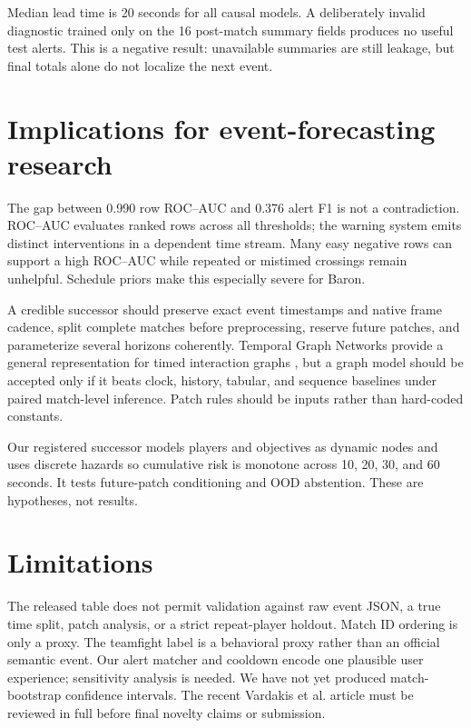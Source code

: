 \documentclass[10pt]{article}
\begin{document}
Median lead time is 20 seconds for all causal models. A deliberately invalid
diagnostic trained only on the 16 post-match summary fields produces no useful
test alerts. This is a negative result: unavailable summaries are still
leakage, but final totals alone do not localize the next event.

\section{Implications for event-forecasting research}

The gap between 0.990 row ROC--AUC and 0.376 alert F1 is not a contradiction.
ROC--AUC evaluates ranked rows across all thresholds; the warning system emits
distinct interventions in a dependent time stream. Many easy negative rows can
support a high ROC--AUC while repeated or mistimed crossings remain unhelpful.
Schedule priors make this especially severe for Baron.

A credible successor should preserve exact event timestamps and native frame
cadence, split complete matches before preprocessing, reserve future patches,
and parameterize several horizons coherently. Temporal Graph Networks provide a
general representation for timed interaction graphs \cite{rossi2020tgn}, but a
graph model should be accepted only if it beats clock, history, tabular, and
sequence baselines under paired match-level inference. Patch rules should be
inputs rather than hard-coded constants.

Our registered successor models players and objectives as dynamic nodes and
uses discrete hazards so cumulative risk is monotone across 10, 20, 30, and 60
seconds. It tests future-patch conditioning and OOD abstention. These are
hypotheses, not results.

\section{Limitations}

The released table does not permit validation against raw event JSON, a true
time split, patch analysis, or a strict repeat-player holdout. Match ID ordering
is only a proxy. The teamfight label is a behavioral proxy rather than an
official semantic event. Our alert matcher and cooldown encode one plausible
user experience; sensitivity analysis is needed. We have not yet produced
match-bootstrap confidence intervals. The recent Vardakis et al. article must
be reviewed in full before final novelty claims or submission.
\end{document}
